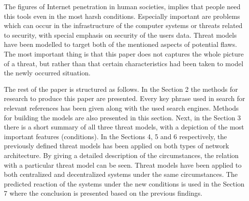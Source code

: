 The figures of Internet penetration \cite{web:internetworldstats} in human societies, implies that people need this tools even in the most harsh conditions. Especially important are problems which can occur in the infrastructure of the computer systems or threats related to security, with special emphasis on security of the users data. Threat models have been modelled to target both of the mentioned aspects of potential flaws. The most important thing is that this paper does not captures the whole picture of a threat, but rather than that certain characteristics had been taken to model the newly occurred situation.

The rest of the paper is structured as follows. In the Section 2 the methods for research to produce this paper are presented. Every key phrase used in search for relevant references has been given along with the used search engines. Methods for building the models are also presented in this section. Next, in the Section 3 there is a short summary of all three threat models, with a depiction of the most important features (conditions). In the Sections 4, 5 and 6 respectively, the previously defined threat models has been applied on both types of network architecture. By giving a detailed description of the circumstances, the relation with a particular threat model can be seen. Threat models have been applied to both centralized and decentralized systems under the same circumstances. The predicted reaction of the systems under the new conditions is used in the Section 7 where the conclusion is presented based on the previous findings.

